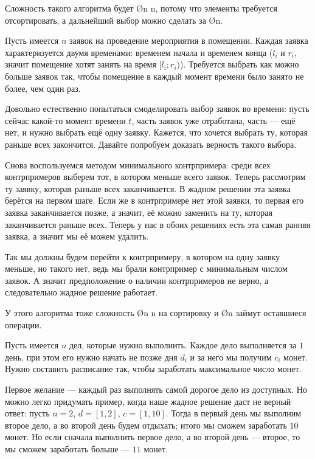 Сложность такого алгоритма будет \O{n \log n}, потому что элементы требуется отсортировать, а дальнейший выбор можно сделать за \O{n}.


Пусть имеется $n$ заявок на проведение мероприятия в помещении. Каждая заявка характеризуется двумя временами: временем начала и временем конца ($l_i$ и $r_i$, значит помещение хотят занять на время $[l_i; r_i)$). Требуется выбрать как можно больше заявок так, чтобы помещение в каждый момент времени было занято не более, чем один раз.

Довольно естественно попытаться смоделировать выбор заявок во времени: пусть сейчас какой-то момент времени $t$, часть заявок уже отработана, часть — ещё нет, и нужно выбрать ещё одну заявку. Кажется, что хочется выбрать ту, которая раньше всех закончится. Давайте попробуем доказать верность такого выбора.

Снова воспользуемся методом минимального контрпримера: среди всех контрпримеров выберем тот, в котором меньше всего заявок. Теперь рассмотрим ту заявку, которая раньше всех заканчивается. В жадном решении эта заявка берётся на первом шаге. Если же в контрпримере нет этой заявки, то первая его заявка заканчивается позже, а значит, её можно заменить на ту, которая заканчивается раньше всех. Теперь у нас в обоих решениях есть эта самая ранняя заявка, а значит мы её можем удалить.

Так мы должны будем перейти к контрпримеру, в котором на одну заявку меньше, но такого нет, ведь мы брали контрпример с минимальным числом заявок. А значит предположение о наличии контрпримеров не верно, а следовательно жадное решение работает.

У этого алгоритма тоже сложность \O{n \log n} на сортировку и \O{n} займут оставшиеся операции.


Пусть имеется $n$ дел, которые нужно выполнить. Каждое дело выполняется за $1$ день, при этом его нужно начать не позже дня $d_i$ и за него мы получим $c_i$ монет. Нужно составить расписание так, чтобы заработать максимальное число монет.

Первое желание — каждый раз выполнять самой дорогое дело из доступных. Но можно легко придумать пример, когда наше жадное решение даст не верный ответ: пусть $n=2$, $d = [1, 2]$, $c = [1, 10]$. Тогда в первый день мы выполним второе дело, а во второй день будем отдыхать; итого мы сможем заработать $10$ монет. Но если сначала выполнить первое дело, а во второй день — второе, то мы сможем заработать больше — $11$ монет.

